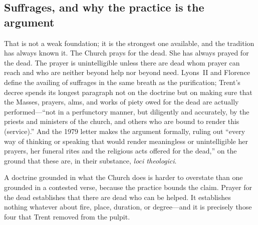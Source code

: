 \subsection{Suffrages, and why the practice is the argument}

That is not a weak foundation; it is the strongest one available, and the tradition has always known it. The Church prays for the dead. She has always prayed for the dead. The prayer is unintelligible unless there are dead whom prayer can reach and who are neither beyond help nor beyond need. Lyons~II and Florence define the availing of suffrages in the same breath as the purification; Trent's decree spends its longest paragraph not on the doctrine but on making sure that the Masses, prayers, alms, and works of piety owed for the dead are actually performed---``not in a perfunctory manner, but diligently and accurately, by the priests and ministers of the church, and others who are bound to render this (service).'' And the 1979 letter makes the argument formally, ruling out ``every way of thinking or speaking that would render meaningless or unintelligible her prayers, her funeral rites and the religious acts offered for the dead,'' on the ground that these are, in their substance, \emph{loci theologici}.

A doctrine grounded in what the Church does is harder to overstate than one grounded in a contested verse, because the practice bounds the claim. Prayer for the dead establishes that there are dead who can be helped. It establishes nothing whatever about fire, place, duration, or degree---and it is precisely those four that Trent removed from the pulpit.
